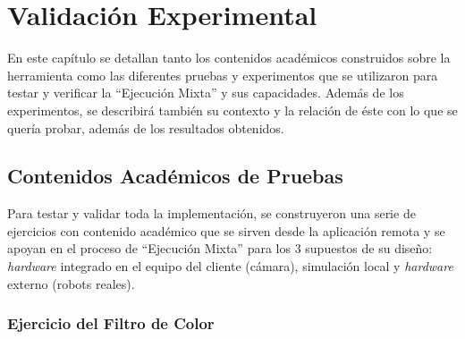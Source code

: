 \chapter{ Validación Experimental}

En este capítulo se detallan tanto los contenidos académicos construidos sobre la herramienta como las diferentes pruebas y experimentos que se utilizaron para testar y verificar la ``Ejecución Mixta'' y sus capacidades. Además de los experimentos, se describirá también su contexto y la relación de éste con lo que se quería probar, además de los resultados obtenidos.

\section{Contenidos Académicos de Pruebas}

Para testar y validar toda la implementación, se construyeron una serie de ejercicios con contenido académico que se sirven desde la aplicación remota y se apoyan en el proceso de ``Ejecución Mixta'' para los 3 supuestos de su diseño: \textit{hardware} integrado en el equipo del cliente (cámara), simulación local y \textit{hardware} externo (robots reales).

\subsection{Ejercicio del Filtro de Color}

